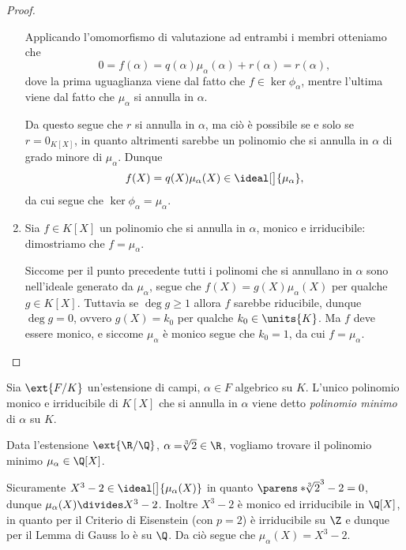 \begin{proof}
\begin{enumerate}[label={(\roman*)}]
        Applicando l'omomorfismo di valutazione ad entrambi i membri otteniamo che \[
            0 = f(\alpha) = q(\alpha)\mu_\alpha(\alpha) + r(\alpha) = r(\alpha),
        \] dove la prima uguaglianza viene dal fatto che $f \in \ker \phi_\alpha$, mentre l'ultima viene dal fatto che $\mu_\alpha$ si annulla in $\alpha$.

        Da questo segue che $r$ si annulla in $\alpha$, ma ciò è possibile se e solo se $r = 0_{K[X]}$, in quanto altrimenti sarebbe un polinomio che si annulla in $\alpha$ di grado minore di $\mu_\alpha$. Dunque \[
            f(X) = q(X)\mu_\alpha(X) \in \ideal[\big]{\mu_\alpha}, 
        \] da cui segue che $\ker \phi_\alpha = \mu_\alpha$.
        \item Sia $f \in K[X]$ un polinomio che si annulla in $\alpha$, monico e irriducibile: dimostriamo che $f = \mu_\alpha$.
        
        Siccome per il punto precedente tutti i polinomi che si annullano in $\alpha$ sono nell'ideale generato da $\mu_\alpha$, segue che $f(X) = g(X)\mu_\alpha(X)$ per qualche $g \in K[X]$. Tuttavia se $\deg g \geq 1$ allora $f$ sarebbe riducibile, dunque $\deg g = 0$, ovvero $g(X) = k_0$ per qualche $k_0 \in \units{K}$. Ma $f$ deve essere monico, e siccome $\mu_\alpha$ è monico segue che $k_0 = 1$, da cui $f = \mu_\alpha$. \qedhere
    \end{enumerate}
\end{proof}

\begin{definition}
     Sia $\ext{F/K}$ un'estensione di campi, $\alpha \in F$ algebrico su $K$. L'unico polinomio monico e irriducibile di $K[X]$ che si annulla in $\alpha$ viene detto \emph{polinomio minimo} di $\alpha$ su $K$.
\end{definition}

\begin{example}
    Data l'estensione $\ext{\R / \Q}$, $\alpha = \!\!\sqrt[3]{2} \in \R$, vogliamo trovare il polinomio minimo $\mu_\alpha \in \Q[X]$.

    Sicuramente $X^3 - 2 \in \ideal[\big]{\mu_\alpha(X)}$ in quanto $\parens*{\!\!\sqrt[3]{2}}^3 - 2 = 0$, dunque $\mu_\alpha(X) \divides X^3 - 2$. Inoltre $X^3 - 2$ è monico ed irriducibile in $\Q[X]$, in quanto per il Criterio di Eisenstein (con $p = 2$) è irriducibile su $\Z$ e dunque per il Lemma di Gauss lo è su $\Q$. Da ciò segue che $\mu_\alpha(X) = X^3 - 2$.
\end{example}

